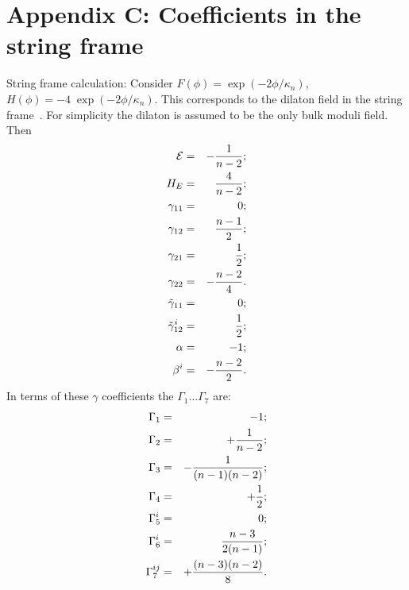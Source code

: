 \documentclass[a4paper,10pt]{article}
\renewcommand{\theequation}{\arabic{section}.\arabic{equation}}
\begin{document}
\appendix
\section*{Appendix C: Coefficients in the string frame}
\label{A:coefficents-in-string}
\setcounter{equation}{0}
\renewcommand{\theequation}{C.\arabic{equation}}


String frame calculation: Consider $F(\phi)=\exp(-2\phi/\kappa_n)$,
$H(\phi)=-4\;\exp(-2\phi/\kappa_n)$. This corresponds to the dilaton
field in the string frame~\cite{generalized-junction}. For simplicity
the dilaton is assumed to be the only bulk moduli field. Then
%
\begin{eqnarray}
{\mathcal E} &=&  - {1\over n-2};
\\
H_E &=& {4\over n-2};
\\
\gamma_{11} &=& 0;
\\
\gamma_{12} &=& {n-1\over2};
\\
\gamma_{21} &=& {1\over2};
\\
\gamma_{22} &=&  - {n-2\over4}.
\\
\tilde\gamma_{11} &=& 0;
\\
\tilde\gamma_{12}^i &=& {1\over2}; 
\\
\alpha &=&  -1;
\\
\beta^i &=& -{n-2\over2}.
\end{eqnarray}
%
In terms of these $\gamma$ coefficients the $\Gamma_1\dots\Gamma_7$
are:
%
\begin{eqnarray}
\Gamma_1 &=& - 1;
\\
\Gamma_2 &=& +{1\over n-2};
\\
\Gamma_3 &=& - {1\over(n-1)(n-2)};
\\
\Gamma_4 &=& + {1\over2};
\\
\Gamma_5^i &=& 0;
\\
\Gamma_6^i &=& {n-3\over2(n-1)};
\\
\Gamma_7^{ij} &=& +{(n-3)(n-2) \over 8}.
\end{eqnarray}
%
\end{document}
